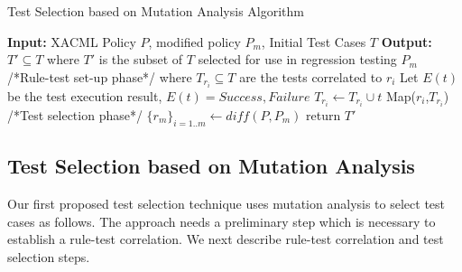 

\begin{algorithmic}
\begin{algorithm}[t]
\caption{\label{alg:mutationanalysis}Test Selection based on Mutation Analysis Algorithm}
\STATE \textbf{Input:} XACML Policy $P$, modified policy $P_{m}$, Initial Test Cases $T$
\STATE \textbf{Output:} $T' \subseteq T$ where $T'$ is the subset of $T$ selected for use in regression testing $P_{m}$
\STATE /*Rule-test set-up phase*/
 where $T_{r_{i}} \subseteq T$ are the tests correlated to $r_{i}$ 
\STATE Let $E(t)$ be the test execution result, $E(t)={Success, Failure}$
\STATE $T_{r_{i}} \leftarrow T_{r_{i}} \cup t$
\ENDIF
\ENDFOR
\STATE Map($r_{i}$,$T_{r_{i}}$)
\ENDFOR
\STATE /*Test selection phase*/
\STATE $\{r_{m}\}_{i=1..m} \leftarrow diff(P,P_{m})$
\ENDFOR
\STATE return $T'$
\end{algorithm}
\end{algorithmic}

\subsection{Test Selection based on Mutation Analysis}
Our first proposed test selection technique uses mutation analysis to select test cases as follows. 
The approach needs a preliminary step which is necessary to establish a rule-test correlation.
We next describe rule-test correlation and test selection steps.

